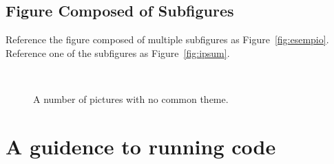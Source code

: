 \documentclass[
12pt, %
a4paper, %
oneside, %
headinclude,footinclude, %
BCOR5mm, %
]{scrartcl}
\begin{document}

\subsection{Figure Composed of Subfigures}

Reference the figure composed of multiple subfigures as Figure~\vref{fig:esempio}. Reference one of the subfigures as Figure~\vref{fig:ipsum}. %

\lipsum[15-18] %

\begin{figure}[tb]
\centering
{} \quad
{} \\
 \quad
{}
\caption[A number of pictures.]{A number of pictures with no common theme.} %
\label{fig:esempio}
\end{figure}


\renewcommand{\refname}{\spacedlowsmallcaps{References}} %


\clearpage



\clearpage
\appendix
\section{A guidence to running code}
\end{document}
